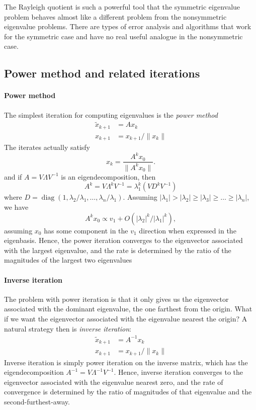 \documentclass[12pt, leqno]{article}
\begin{document}
The Rayleigh quotient is such a powerful tool that the symmetric
eigenvalue problem behaves almost like a different problem from
the nonsymmetric eigenvalue problems.  There are types of error
analysis and algorithms that work for the symmetric case and have
no real useful analogue in the nonsymmetric case.

\subsection{Power method and related iterations}

\paragraph{Power method}
The simplest iteration for computing eigenvalues is the {\em power
  method}
\begin{align*}
  \tilde{x}_{k+1} &= A x_k \\
  x_{k+1} &= x_{k+1}/\|x_k\|
\end{align*}
The iterates actually satisfy
\[
  x_{k} = \frac{A^k x_0}{\|A^k x_0\|}.
\]
and if $A = V \Lambda V^{-1}$ is an eigendecomposition, then
\[
  A^k = V \Lambda^k V^{-1} = \lambda_1^k (V D^k V^{-1})
\]
where
$D = \operatorname{diag}(1, \lambda_2/\lambda_1, \ldots, \lambda_n/\lambda_1)$.
Assuming $|\lambda_1| > |\lambda_2| \geq |\lambda_3| \geq \ldots \geq
|\lambda_n|$, we have
\[
  A^k x_0 \propto v_1 + O\left( |\lambda_2|^k/|\lambda_1|^k \right),
\]
assuming $x_0$ has some component in the $v_1$ direction when
expressed in the eigenbasis.  Hence, the power iteration converges
to the eigenvector associated with the largest eigenvalue, and the
rate is determined by the ratio of the magnitudes of the largest two
eigenvalues

\paragraph{Inverse iteration}
The problem with power iteration is that it only gives us the
eigenvector associated with the dominant eigenvalue, the one farthest
from the origin.  What if we want the eigenvector associated with the
eigenvalue nearest the origin?  A natural strategy then is {\em
  inverse iteration}:
\begin{align*}
  \tilde{x}_{k+1} &= A^{-1} x_k \\
  x_{k+1} &= x_{k+1}/\|x_k\|
\end{align*}
Inverse iteration is simply power iteration on the inverse matrix,
which has the eigendecomposition $A^{-1} = V \Lambda^{-1} V^{-1}$.
Hence, inverse iteration converges to the eigenvector associated with
the eigenvalue nearest zero, and the rate of convergence is determined
by the ratio of magnitudes of that eigenvalue and the second-furthest-away.
\end{document}
